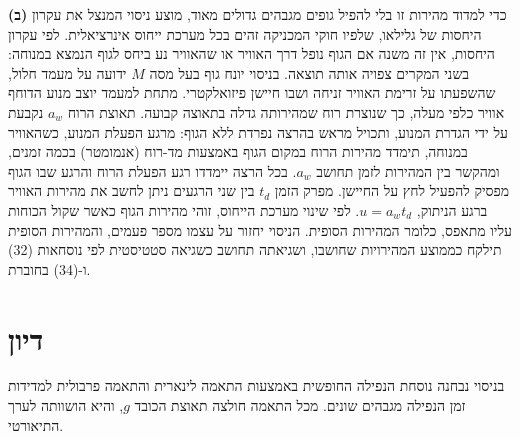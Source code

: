 \documentclass[10pt,a4paper]{article}
\newcommand{\partner}[1]{\textcolor{partnergreen}{#1}}
\begin{document}
\textbf{(ב)}
כדי למדוד מהירות זו בלי להפיל גופים מגבהים גדולים מאוד, מוצע ניסוי המנצל את עקרון היחסות של גלילאו, שלפיו חוקי המכניקה זהים בכל מערכת ייחוס אינרציאלית.
\partner{לפי עקרון היחסות,} אין זה משנה אם הגוף נופל דרך האוויר או שהאוויר נע ביחס לגוף הנמצא במנוחה: בשני המקרים צפויה אותה תוצאה.
בניסוי יונח גוף בעל מסה $M$ ידועה על מעמד חלול, שהשפעתו על זרימת האוויר זניחה ושבו חיישן פיזואלקטרי. מתחת למעמד יוצב מנוע הדוחף אוויר כלפי מעלה, כך שנוצרת רוח שמהירותה גדלה בתאוצה קבועה.
\partner{תאוצת הרוח $a_w$ נקבעת על ידי הגדרת המנוע, ותכויל מראש בהרצה נפרדת ללא הגוף: מרגע הפעלת המנוע, כשהאוויר במנוחה, תימדד מהירות הרוח במקום הגוף באמצעות מד-רוח (אנמומטר) בכמה זמנים, ומהקשר בין המהירות לזמן תחושב $a_w$.}
בכל הרצה יימדדו רגע הפעלת הרוח והרגע שבו הגוף מפסיק להפעיל לחץ על החיישן.
מפרק הזמן \partner{$t_d$} בין שני הרגעים ניתן לחשב את מהירות האוויר ברגע הניתוק\partner{, $u = a_w t_d$}. לפי שינוי מערכת הייחוס, זוהי מהירות הגוף כאשר שקול הכוחות עליו מתאפס, כלומר המהירות הסופית.
\partner{הניסוי יחזור על עצמו מספר פעמים, והמהירות הסופית תילקח כממוצע המהירויות שחושבו, ושגיאתה תחושב כשגיאה סטטיסטית לפי נוסחאות (32) ו-(34) בחוברת.}

\section*{דיון}
בניסוי נבחנה נוסחת הנפילה החופשית באמצעות התאמה לינארית והתאמה פרבולית למדידות זמן הנפילה מגבהים שונים. מכל התאמה חולצה תאוצת הכובד $g$, והיא הושוותה לערך התיאורטי.

\end{document}
